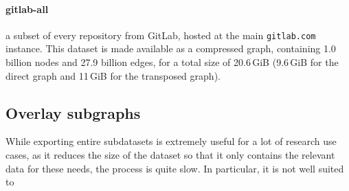 \paragraph{gitlab-all} a subset of every repository from GitLab, hosted at the
main \texttt{gitlab.com} instance. This dataset is made available as a
compressed graph, containing 1.0 billion nodes and 27.9 billion edges, for a
total size of 20.6\,GiB (9.6\,GiB for the direct graph and 11\,GiB for the
transposed graph).

\subsection{Overlay subgraphs}

While exporting entire subdatasets is extremely useful for a lot of research
use cases, as it reduces the size of the dataset so that it only contains the
relevant data for these needs, the process is quite slow. In particular, it is
not well suited to \TODO{}

